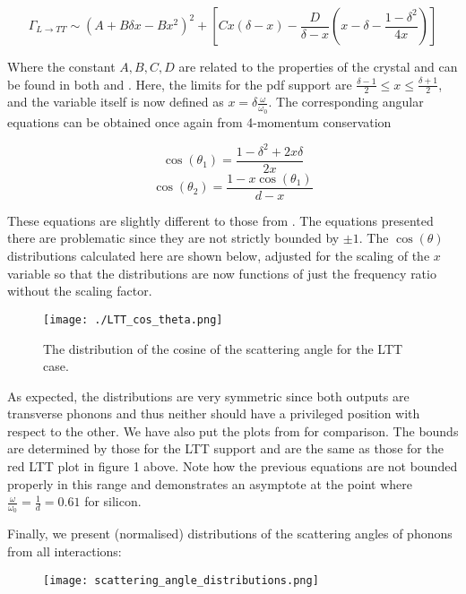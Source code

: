\documentclass[11pt]{article}
\begin{document}
\begin{equation}
\Gamma_{L\rightarrow TT} \sim (A + B\delta x - Bx^2)^2 + \left[Cx(\delta - x) - \frac{D}{\delta - x}\left(x - \delta - \frac{1-\delta^2}{4x}\right)\right]
\end{equation}

Where the constant $A, B, C, D$ are related to the properties of the crystal and can be found in both \cite{2} and \cite{3}. Here, the limits
for the pdf support are $\frac{\delta - 1}{2} \leq x \leq \frac{\delta + 1}{2}$, and the variable itself is now defined as $x = \delta\frac{\omega}
{\omega_0}$. The corresponding angular equations can be obtained once again from
4-momentum conservation 

\begin{equation}
\cos(\theta_1) = \frac{1 - \delta^2 + 2x\delta}{2x}
\end{equation}
\begin{equation}
\cos(\theta_2) = \frac{1 - x\cos(\theta_1)}{d - x}
\end{equation}

These equations are slightly different to those from \cite{1}. The equations presented there are problematic since they are not strictly bounded
by $\pm 1$. The $\cos(\theta)$ distributions calculated here are shown below, adjusted for the scaling of the $x$ variable so that the distributions
are now functions of just the frequency ratio without the scaling factor.

\begin{figure}[!h]
\centering
\texttt{[image: ./LTT\_cos\_theta.png]}
\caption{The distribution of the cosine of the scattering angle for the LTT case.}
\end{figure}

As expected, the distributions are very symmetric since both outputs are transverse phonons and thus neither should have a privileged position with 
respect to the other. We have also put the plots from \cite{2} for comparison. The bounds are determined by those for the LTT support and are
the same as those for the red LTT plot in figure 1 above. Note how the previous equations are not bounded properly in this range and 
demonstrates an asymptote at the point where $\frac{\omega}{\omega_0} = \frac{1}{d} = 0.61$ for silicon.

\pagebreak
Finally, we present (normalised) distributions of the scattering angles of phonons from all interactions:

\begin{figure}[!h]
\centering
\texttt{[image: scattering\_angle\_distributions.png]}
\end{figure}
\end{document}
